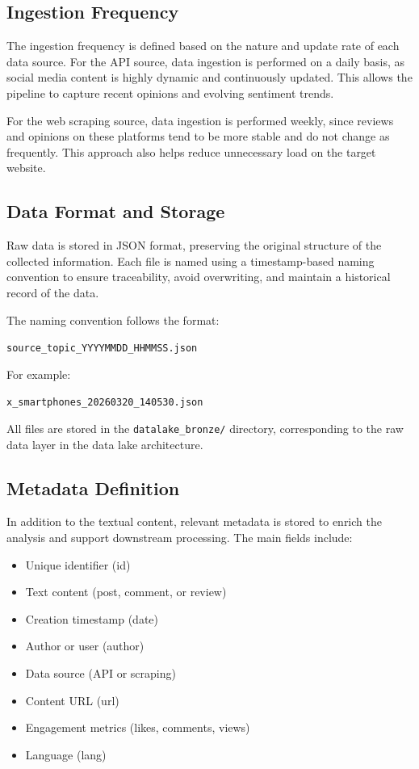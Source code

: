 \documentclass[12pt]{article}
\begin{document}
\subsection{Ingestion Frequency}
The ingestion frequency is defined based on the nature and update rate of each data source. For the API source, data ingestion is performed on a daily basis, as social media content is highly dynamic and continuously updated. This allows the pipeline to capture recent opinions and evolving sentiment trends.

For the web scraping source, data ingestion is performed weekly, since reviews and opinions on these platforms tend to be more stable and do not change as frequently. This approach also helps reduce unnecessary load on the target website.

\subsection{Data Format and Storage}
Raw data is stored in JSON format, preserving the original structure of the collected information. Each file is named using a timestamp-based naming convention to ensure traceability, avoid overwriting, and maintain a historical record of the data.

The naming convention follows the format:

\texttt{source\_topic\_YYYYMMDD\_HHMMSS.json}

For example:

\texttt{x\_smartphones\_20260320\_140530.json}

All files are stored in the \texttt{datalake\_bronze/} directory, corresponding to the raw data layer in the data lake architecture.

\subsection{Metadata Definition}
In addition to the textual content, relevant metadata is stored to enrich the analysis and support downstream processing. The main fields include:

\begin{itemize}
    \item Unique identifier (id)
    \item Text content (post, comment, or review)
    \item Creation timestamp (date)
    \item Author or user (author)
    \item Data source (API or scraping)
    \item Content URL (url)
    \item Engagement metrics (likes, comments, views)
    \item Language (lang)
\end{itemize}
\end{document}

